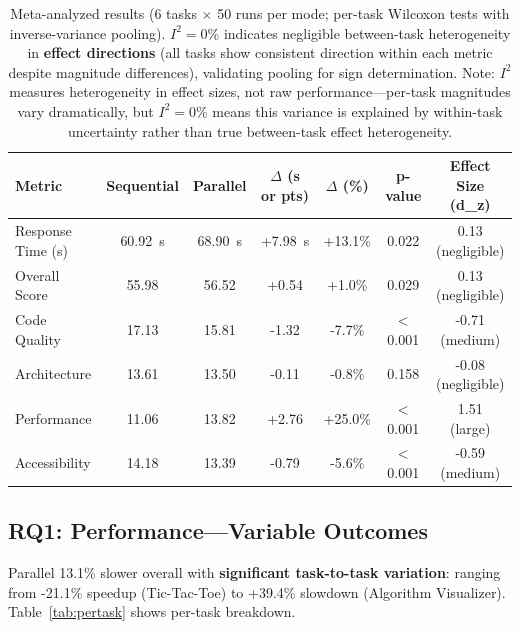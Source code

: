 \documentclass{article}
\begin{document}
\begin{table}[t]
\caption{Meta-analyzed results (6 tasks $\times$ 50 runs per mode; per-task Wilcoxon tests with inverse-variance pooling). $I^{2}=0\%$ indicates negligible between-task heterogeneity in \textbf{effect directions} (all tasks show consistent direction within each metric despite magnitude differences), validating pooling for sign determination. Note: $I^{2}$ measures heterogeneity in effect sizes, not raw performance---per-task magnitudes vary dramatically, but $I^{2}=0\%$ means this variance is explained by within-task uncertainty rather than true between-task effect heterogeneity.}
\label{tab:results}
\vskip 0.15in
\centering
\small
\begin{tabular}{lcccccc}
\toprule
\textbf{Metric} & \textbf{Sequential} & \textbf{Parallel} & \textbf{$\Delta$ (s or pts)} & \textbf{$\Delta$ (\%)} & \textbf{p-value} & \textbf{Effect Size (d\_z)} \\
\midrule
Response Time (s) & 60.92~s & 68.90~s & +7.98~s & +13.1\% & 0.022 & 0.13 (negligible) \\
Overall Score & 55.98 & 56.52 & +0.54 & +1.0\% & 0.029 & 0.13 (negligible) \\
Code Quality & 17.13 & 15.81 & -1.32 & -7.7\% & $<$0.001 & -0.71 (medium) \\
Architecture & 13.61 & 13.50 & -0.11 & -0.8\% & 0.158 & -0.08 (negligible) \\
Performance & 11.06 & 13.82 & +2.76 & +25.0\% & $<$0.001 & 1.51 (large) \\
Accessibility & 14.18 & 13.39 & -0.79 & -5.6\% & $<$0.001 & -0.59 (medium) \\
\bottomrule
\end{tabular}
\end{table}

\subsection{RQ1: Performance---Variable Outcomes}

Parallel 13.1\% slower overall with \textbf{significant task-to-task variation}: ranging from -21.1\% speedup (Tic-Tac-Toe) to +39.4\% slowdown (Algorithm Visualizer). Table~\ref{tab:pertask} shows per-task breakdown.
\end{document}
